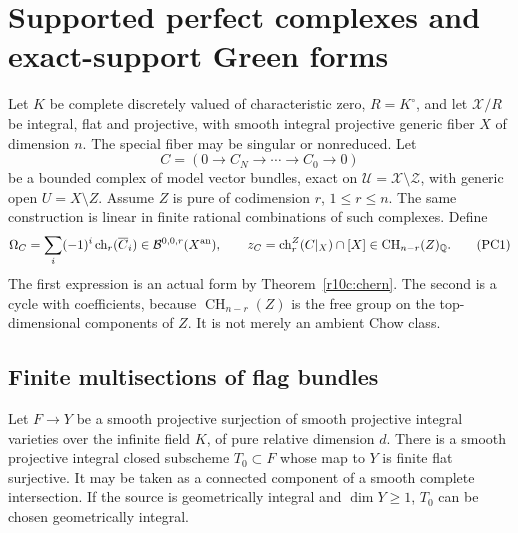 \section{Supported perfect complexes and exact-support Green forms}
\label{r11p:supported-complex}

Let $K$ be complete discretely valued of characteristic zero, $R=K^\circ$,
and let $\mathcal X/R$ be integral, flat and projective, with smooth
integral projective generic fiber $X$ of dimension $n$.
The special fiber may be singular or nonreduced.  Let
\[
       C=(0\longrightarrow C_N\longrightarrow\cdots
                             \longrightarrow C_0\longrightarrow0)
\]
be a bounded complex of model vector bundles, exact on
$\mathcal U=\mathcal X\setminus\mathcal Z$, with generic open
$U=X\setminus Z$.  Assume $Z$ is pure of codimension $r$, $1\leq r\leq n$.
The same construction is linear in finite rational combinations of
such complexes.  Define
\[
 \Omega_C=\sum_i(-1)^i\operatorname{ch}_r(\overline C_i)
                              \in\mathcal B^{0,0,r}(X^{\rm an}),
 \qquad
 z_C=\operatorname{ch}^{Z}_r(C|_X)\cap[X]
                              \in\operatorname{CH}_{n-r}(Z)_{\mathbb Q}.
\tag{PC1}\label{r11p:omega-and-cycle}
\]
The first expression is an actual form by Theorem~\ref{r10c:chern}.
The second is a cycle with coefficients, because
$\operatorname{CH}_{n-r}(Z)$ is the free group on the top-dimensional
components of $Z$.  It is not merely an ambient Chow class.

\subsection{Finite multisections of flag bundles}

\begin{lemma}
\label{r11p:multisection}
Let $F\to Y$ be a smooth projective surjection of smooth projective
integral varieties over the infinite field $K$, of pure relative
dimension $d$.  There is a smooth projective integral closed subscheme
$T_0\subset F$ whose map to $Y$ is finite flat surjective.
It may be taken as a connected component of a smooth complete intersection.
If the source is geometrically integral and $\dim Y\geq1$, $T_0$
can be chosen geometrically integral.
\end{lemma}

